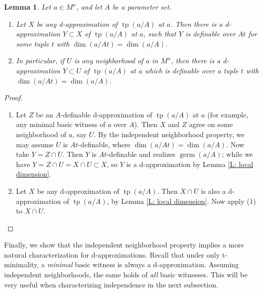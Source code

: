 \documentclass{amsart}
\newtheorem{lemma}[theorem]{Lemma}
\theoremstyle{definition}
\newcommand{\tp}{\operatorname{tp}}
\begin{document}
\begin{lemma}\label{L: GenOS}
    Let $a\in M^n$, and let $A$ be a parameter set. \begin{enumerate}
        \item Let $X$ be any d-approximation of $\tp(a/A)$ at $a$. Then there is a d-approximation $Y\subset X$ of $\tp(a/A)$ at $a$, such that $Y$ is definable over $At$ for some tuple $t$ with $\dim(a/At)=\dim(a/A)$.
        \item In particular, if $U$ is any neighborhood of $a$ in $M^n$, then there is a d-approximation $Y\subset U$ of $\tp(a/A)$ at $a$ which is definable over a tuple $t$ with $\dim(a/At)=\dim(a/A)$.
    \end{enumerate}
\end{lemma}
\begin{proof}
\begin{enumerate}
    \item Let $Z$ be an $A$-definable d-approximation of $\tp(a/A)$ at $a$ (for example, any minimal basic witness of $a$ over $A$). Then $X$ and $Z$ agree on some neighborhood of $a$, say $U$. By the independent neighborhood property, we may assume $U$ is $At$-definable, where $\dim(a/At)=\dim(a/A)$. Now take $Y=Z\cap U$. Then $Y$ is $At$-definable and realizes $\operatorname{germ}(a/A)$; while we have $Y=Z\cap U=X\cap U\subset X$, so $Y$ is a d-approximation by Lemma \ref{L: local dimension}.
    \item Let $X$ be any d-approximation of $\tp(a/A)$. Then $X\cap U$ is also a d-approximation of $\tp(a/A)$, by Lemma \ref{L: local dimension}. Now apply (1) to $X\cap U$.
\end{enumerate}
\end{proof}

Finally, we show that the independent neighborhood property implies a more natural characterization for d-approximations. Recall that under only t-minimality, a \textit{minimal} basic witness is always a d-approximation. Assuming independent neighborhoods, the same holds of \textit{all} basic witnesses. This will be very useful when characterizing independence in the next subsection.
\end{document}
